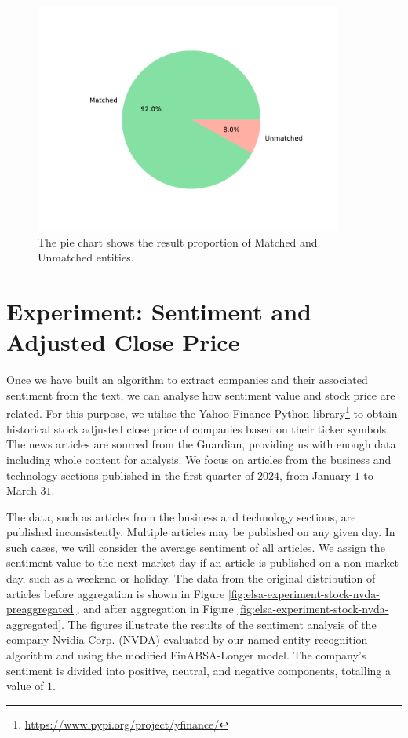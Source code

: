 \begin{figure}[htb]
    \centering
    \includegraphics[width=0.9\textwidth]{img/elsa/proportion_matched_unmatched-a.pdf}
    \caption{The pie chart shows the result proportion of Matched and Unmatched entities.}
    \label{fig:elsa-proportion-matched-unmatched}
\end{figure}

\section{Experiment: Sentiment and Adjusted Close Price}
\label{sec:elsa-experiment-stock-price-correlation}
Once we have built an algorithm to extract companies and their associated sentiment from the text, we can analyse how sentiment value and stock price are related. For this purpose, we utilise the Yahoo Finance Python library\footnote{\href{https://www.pypi.org/project/yfinance/}{https://www.pypi.org/project/yfinance/}} to obtain historical stock adjusted close price \parencite{adj_close_bib} of companies based on their ticker symbols. The news articles are sourced from the Guardian, providing us with enough data including whole content for analysis. We focus on articles from the business and technology sections published in the first quarter of $2024$, from January $1$ to March $31$.

The data, such as articles from the business and technology sections, are published inconsistently. Multiple articles may be published on any given day. In such cases, we will consider the average sentiment of all articles. We assign the sentiment value to the next market day if an article is published on a non-market day, such as a weekend or holiday. The data from the original distribution of articles before aggregation is shown in Figure \ref{fig:elsa-experiment-stock-nvda-preaggregated}, and after aggregation in Figure \ref{fig:elsa-experiment-stock-nvda-aggregated}. The figures illustrate the results of the sentiment analysis of the company Nvidia Corp. (NVDA) evaluated by our named entity recognition algorithm and using the modified FinABSA-Longer model. The company's sentiment is divided into positive, neutral, and negative components, totalling a value of $1$.

